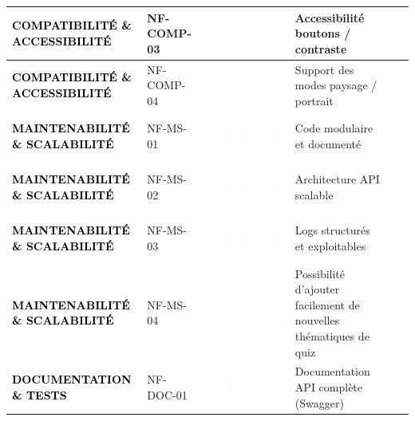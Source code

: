 \begin{longtable}{|P{2.15cm}|P{1.55cm}|P{2.35cm}|P{5.60cm}|P{1.65cm}|P{1.45cm}|}
\textcolor{black}{\textbf{COMPATIBILITÉ \& ACCESSIBILITÉ}} & NF-COMP-03 & \textcolor{white}{\textbf{Application Apprenant}} & Accessibilité boutons / contraste &  &  \\ \hline
{}
\textcolor{black}{\textbf{COMPATIBILITÉ \& ACCESSIBILITÉ}} & NF-COMP-04 & \textcolor{white}{\textbf{Application Apprenant}} & Support des modes paysage / portrait &  &  \\ \hline
{}
\textcolor{black}{\textbf{MAINTENABILITÉ \& SCALABILITÉ}} & NF-MS-01 & \textcolor{white}{\textbf{Backend / API \& Base de Données}} & Code modulaire et documenté &  &  \\ \hline
{}
\textcolor{black}{\textbf{MAINTENABILITÉ \& SCALABILITÉ}} & NF-MS-02 & \textcolor{white}{\textbf{Backend / API \& Base de Données}} & Architecture API scalable &  &  \\ \hline
{}
\textcolor{black}{\textbf{MAINTENABILITÉ \& SCALABILITÉ}} & NF-MS-03 & \textcolor{white}{\textbf{Backend / API \& Base de Données}} & Logs structurés et exploitables &  &  \\ \hline
{}
\textcolor{black}{\textbf{MAINTENABILITÉ \& SCALABILITÉ}} & NF-MS-04 & \textcolor{white}{\textbf{Contenus pédagogiques}} & Possibilité d’ajouter facilement de nouvelles thématiques de quiz &  &  \\ \hline
{}
\textcolor{black}{\textbf{DOCUMENTATION \& TESTS}} & NF-DOC-01 & \textcolor{white}{\textbf{Backend / API \& Base de Données}} & Documentation API complète (Swagger) &  &  \\ \hline

\end{longtable}
